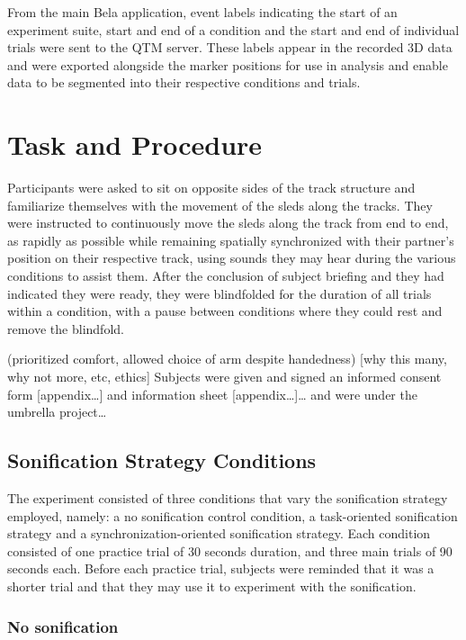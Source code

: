 \documentclass[10pt,a4paper,onecolumn]{article}
\begin{document}
From the main Bela application, event labels indicating the start of an experiment suite, start and end of a condition and the start and end of individual trials were sent to the QTM server. These labels appear in the recorded 3D data and were exported alongside the marker positions for use in analysis and enable data to be segmented into their respective conditions and trials.

\hypertarget{task-and-procedure}{%
\section{Task and Procedure}\label{task-and-procedure}}

Participants were asked to sit on opposite sides of the track structure and familiarize themselves with the movement of the sleds along the tracks. They were instructed to continuously move the sleds along the track from end to end, as rapidly as possible while remaining spatially synchronized with their partner's position on their respective track, using sounds they may hear during the various conditions to assist them. After the conclusion of subject briefing and they had indicated they were ready, they were blindfolded for the duration of all trials within a condition, with a pause between conditions where they could rest and remove the blindfold.

(prioritized comfort, allowed choice of arm despite handedness) {[}why this many, why not more, etc, ethics{]} Subjects were given and signed an informed consent form {[}appendix\ldots{]} and information sheet {[}appendix\ldots{]}\ldots{} and were under the umbrella project\ldots{}

\hypertarget{sonification-strategy-conditions}{%
\subsection{Sonification Strategy Conditions}\label{sonification-strategy-conditions}}

The experiment consisted of three conditions that vary the sonification strategy employed, namely: a no sonification control condition, a task-oriented sonification strategy and a synchronization-oriented sonification strategy. Each condition consisted of one practice trial of 30 seconds duration, and three main trials of 90 seconds each. Before each practice trial, subjects were reminded that it was a shorter trial and that they may use it to experiment with the sonification.

\hypertarget{no-sonification}{%
\subsubsection{No sonification}\label{no-sonification}}
\end{document}
